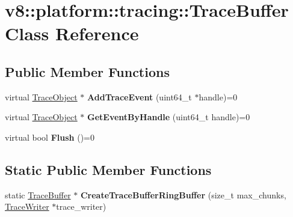 \hypertarget{classv8_1_1platform_1_1tracing_1_1TraceBuffer}{}\section{v8\+:\+:platform\+:\+:tracing\+:\+:Trace\+Buffer Class Reference}
\label{classv8_1_1platform_1_1tracing_1_1TraceBuffer}
\subsection*{Public Member Functions}
\begin{DoxyCompactItemize}
\item 
\mbox{\label{classv8_1_1platform_1_1tracing_1_1TraceBuffer_a0680714161394e7b93cf2ac32f3d6b72}} 
virtual \mbox{\hyperlink{classv8_1_1platform_1_1tracing_1_1TraceObject}{Trace\+Object}} $\ast$ {\bfseries Add\+Trace\+Event} (uint64\+\_\+t $\ast$handle)=0
\item 
\mbox{\label{classv8_1_1platform_1_1tracing_1_1TraceBuffer_a9749c2155f2c483625d0242d9a7eb0ec}} 
virtual \mbox{\hyperlink{classv8_1_1platform_1_1tracing_1_1TraceObject}{Trace\+Object}} $\ast$ {\bfseries Get\+Event\+By\+Handle} (uint64\+\_\+t handle)=0
\item 
\mbox{\label{classv8_1_1platform_1_1tracing_1_1TraceBuffer_ad16dbfbda98253565b3af122e60aa636}} 
virtual bool {\bfseries Flush} ()=0
\end{DoxyCompactItemize}
\subsection*{Static Public Member Functions}
\begin{DoxyCompactItemize}
\item 
\mbox{\label{classv8_1_1platform_1_1tracing_1_1TraceBuffer_aa5389ad37c2d2c12cdbefba2a45731f1}} 
static \mbox{\hyperlink{classv8_1_1platform_1_1tracing_1_1TraceBuffer}{Trace\+Buffer}} $\ast$ {\bfseries Create\+Trace\+Buffer\+Ring\+Buffer} (size\+\_\+t max\+\_\+chunks, \mbox{\hyperlink{classv8_1_1platform_1_1tracing_1_1TraceWriter}{Trace\+Writer}} $\ast$trace\+\_\+writer)
\end{DoxyCompactItemize}
